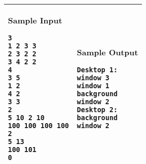 \newpage

\begin{table}[!h]
\centering
\begin{tabular}{|l|l|}
\hline
\begin{minipage}[t]{3in}
\textbf{Sample Input}
\begin{verbatim}
3
1 2 3 3
2 3 2 2
3 4 2 2
4
3 5
1 2
4 2
3 3
2
5 10 2 10
100 100 100 100
2
5 13
100 101
0
\end{verbatim}
\vspace{1mm}
\end{minipage}
&

\begin{minipage}[t]{3in}
\textbf{Sample Output}
\begin{verbatim}
Desktop 1:
window 3
window 1
background
window 2
Desktop 2:
background
window 2
\end{verbatim}
\vspace{1mm}
\end{minipage} \\
\hline
\end{tabular}
\end{table}

\newpage
